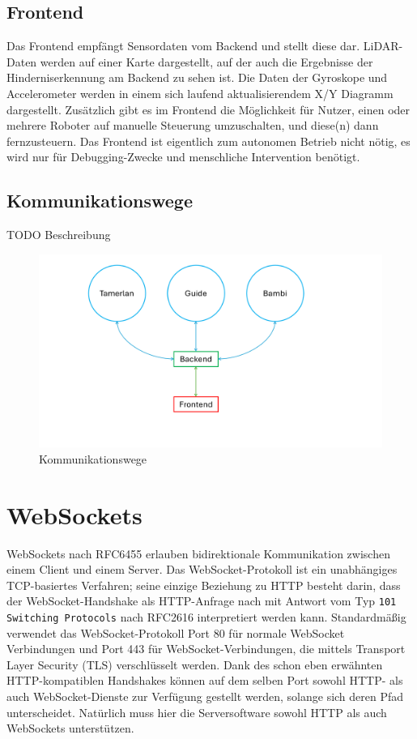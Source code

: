 \subsection{Frontend}
Das Frontend empfängt Sensordaten vom Backend und stellt diese dar.
%
LiDAR-Daten werden auf einer Karte dargestellt,
auf der auch die Ergebnisse der Hinderniserkennung am Backend zu sehen ist.
%
Die Daten der Gyroskope und Accelerometer werden in einem sich laufend aktualisierendem X/Y Diagramm dargestellt.
%
Zusätzlich gibt es im Frontend die Möglichkeit für Nutzer,
einen oder mehrere Roboter auf manuelle Steuerung umzuschalten,
und diese(n) dann fernzusteuern.
%
Das Frontend ist eigentlich zum autonomen Betrieb nicht nötig,
es wird nur für Debugging-Zwecke und menschliche Intervention benötigt.

\subsection{Kommunikationswege}
\label{subsec:ueberblick_comms}
TODO Beschreibung
\begin{figure}[H]
    \centering
        \includegraphics[width=\textwidth, center]{img/Kommunikationswege.png}  
    \caption{Kommunikationswege}
    \label{fig:kommunikationswege}
\end{figure}

\section{WebSockets}
\label{sec:websockets}
WebSockets nach RFC6455 \cite{rfc6455} erlauben bidirektionale Kommunikation zwischen einem Client und einem Server.
%
Das WebSocket-Protokoll ist ein unabhängiges TCP-basiertes Verfahren;
seine einzige Beziehung zu HTTP besteht darin,
dass der WebSocket-Handshake als HTTP-Anfrage nach mit Antwort vom Typ
\texttt{101 Switching Protocols} nach RFC2616 \cite{rfc2616} interpretiert werden kann.
%
Standardmäßig verwendet das WebSocket-Protokoll Port 80 für normale WebSocket
Verbindungen und Port 443 für WebSocket-Verbindungen,
die mittels Transport Layer Security (TLS) verschlüsselt werden.
%
Dank des schon eben erwähnten HTTP-kompatiblen Handshakes
können auf dem selben Port sowohl HTTP- als auch WebSocket-Dienste zur Verfügung gestellt werden,
solange sich deren Pfad unterscheidet.
%
Natürlich muss hier die Serversoftware sowohl HTTP als auch WebSockets unterstützen.

